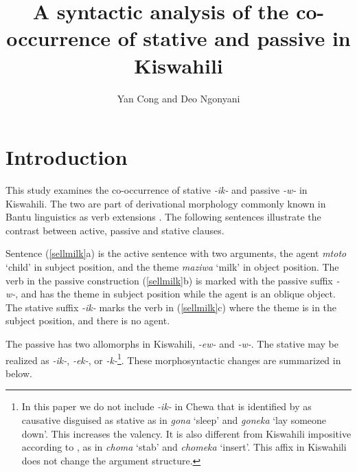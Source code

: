 \documentclass[output=paper]{langscibook}
\author{Yan Cong\affiliation{Michigan State University} and Deo Ngonyani\affiliation{Michigan State University}}
\title{A syntactic analysis of the co-occurrence of stative and passive in Kiswahili}
\begin{document}
\maketitle

\section{Introduction}
This study examines the co-occurrence of stative \textit{-ik-} and passive \textit{-w-} in Kiswahili. The two are part of derivational morphology commonly known in Bantu linguistics as verb extensions \citep{Guthrie1962a}. The following sentences illustrate the contrast between active, passive and stative clauses.  


 \begin{exe}
    \ex\label{sellmilk}{
    \begin{xlist}
    \end{xlist}}
\end{exe}

Sentence (\ref{sellmilk}a) is the active sentence with two arguments, the agent \textit{mtoto} `child' in subject position, and the theme \textit{maziwa} `milk' in object position. The verb in the passive construction (\ref{sellmilk}b) is marked with the passive suffix \textit{-w-}, and has the theme in subject position while the agent is an oblique object. The stative suffix \textit{-ik-} marks the verb in (\ref{sellmilk}c) where the theme is in the subject position, and there is no agent. 

The passive has two allomorphs in Kiswahili, \textit{-ew-} and \textit{-w-}. The stative may be realized as \textit{-ik-}, \textit{-ek-}, or \textit{-k-}\footnote{In this paper we do not include \textit{-ik-} in Chewa that is identified by \citet{Simango:2009aa} as causative disguised as stative as in \textit{gona} `sleep' and \textit{goneka} `lay someone down'. This increases the valency. It is also different from Kiswahili impositive according to \citet{8603069}, as in \textit{choma} `stab' and \textit{chomeka} `insert'. This affix in Kiswahili does not change the argument structure.}. These morphosyntactic changes are summarized in  below.  
\end{document}
